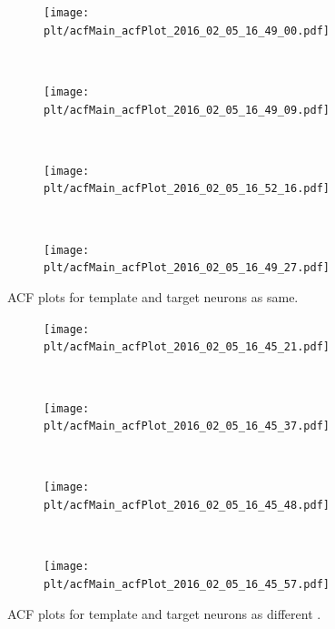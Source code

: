 \documentclass[11pt,paper=a4,answers]{exam}
\newcommand{\plt}{../../plots}
\begin{document}
\begin{figure}
    \centering
    \begin{subfigure}[b]{.48\textwidth}
        \centering
        \texttt{[image: \\plt/acfMain\_acfPlot\_2016\_02\_05\_16\_49\_00.pdf]}
    \end{subfigure}
    ~
    \begin{subfigure}[b]{.48\textwidth}
        \centering
        \texttt{[image: \\plt/acfMain\_acfPlot\_2016\_02\_05\_16\_49\_09.pdf]}
    \end{subfigure}
    \\
    \begin{subfigure}[b]{.48\textwidth}
        \centering
        \texttt{[image: \\plt/acfMain\_acfPlot\_2016\_02\_05\_16\_52\_16.pdf]}
    \end{subfigure}
    ~
    \begin{subfigure}[b]{.48\textwidth}
        \centering
        \texttt{[image: \\plt/acfMain\_acfPlot\_2016\_02\_05\_16\_49\_27.pdf]}
    \end{subfigure}
    \caption{ACF plots for template and target neurons as same.}
    \label{img:acf1}
\end{figure}

\begin{figure}
    \centering
    \begin{subfigure}[b]{.48\textwidth}
        \centering
        \texttt{[image: \\plt/acfMain\_acfPlot\_2016\_02\_05\_16\_45\_21.pdf]}
    \end{subfigure}
    ~
    \begin{subfigure}[b]{.48\textwidth}
        \centering
        \texttt{[image: \\plt/acfMain\_acfPlot\_2016\_02\_05\_16\_45\_37.pdf]}
    \end{subfigure}
    \\
    \begin{subfigure}[b]{.48\textwidth}
        \centering
        \texttt{[image: \\plt/acfMain\_acfPlot\_2016\_02\_05\_16\_45\_48.pdf]}
    \end{subfigure}
    ~
    \begin{subfigure}[b]{.48\textwidth}
        \centering
        \texttt{[image: \\plt/acfMain\_acfPlot\_2016\_02\_05\_16\_45\_57.pdf]}
    \end{subfigure}
    \caption{ACF plots for template and target neurons as different .}
    \label{img:acf2}
\end{figure}
\end{document}
